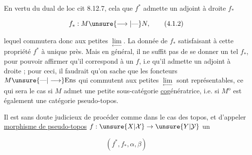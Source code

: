 
En vertu du dual de loc cit 8.12.7, cela  que $f^{*}$ admette un adjoint à droite $f_{*}$

\[
f_{*}:M\unsure{\longrightarrow|\text{---}}N,
\tag*{(4.1.2)}
\]

lequel commutera donc aux petites $\underset{\longleftarrow}{\lim}$. La donnée de $f_{*}$ satisfaisant à cette propriété   $f^{*}$ à  unique près. Mais en général, il ne suffit pas de se donner un tel $f_{*}$, pour pouvoir affirmer qu'il correspond à un $f$, i.e qu'il admette un adjoint à droite ; pour ceci, il faudrait qu'on sache que les foncteurs $M\unsure{\text{---}|\longrightarrow}\mathrm{Ens}$ qui commutent aux petites $\underset{\longleftarrow}{\lim}$ sont représentables, ce qui sera le cas si $M$ admet une petite sous-catégorie \uline{co}génératrice, i.e. si $M^{\mathrm{o}}$ est également une catégorie pseudo-topos.

Il est sans doute judicieux de procéder comme dans le cas des topos, et d'appeler \uline{morphisme de pseudo-topos} $f:\unsure{X|\mathcal X}\to\unsure{Y|\mathcal Y}$ un 

\[
(f^{*},f_{*},\alpha,\beta)
\tag*{(4.1.3)}
\]
